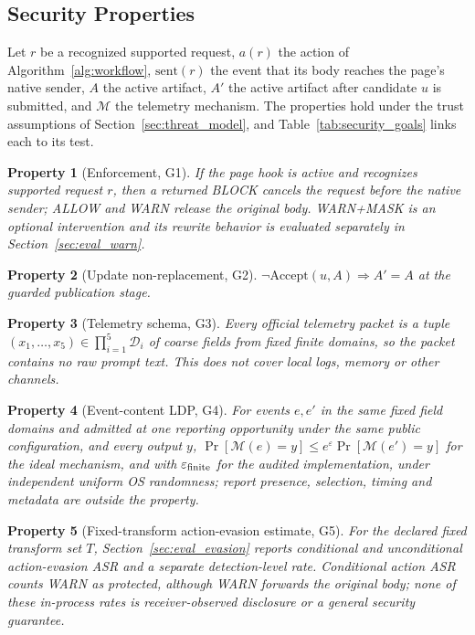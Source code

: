 \documentclass[sigconf]{acmart}
\theoremstyle{acmdefinition}\newtheorem{property}{Property}
\begin{document}
\subsection{Security Properties}
\label{sec:properties}
Let $r$ be a recognized supported request, $a(r)$ the action of Algorithm~\ref{alg:workflow}, $\mathrm{sent}(r)$ the event that its body reaches the page's native sender, $A$ the active artifact, $A'$ the active artifact after candidate $u$ is submitted, and $\mathcal M$ the telemetry mechanism. The properties hold under the trust assumptions of Section~\ref{sec:threat_model}, and Table~\ref{tab:security_goals} links each to its test.

\begin{property}[Enforcement, G1]\label{prop:g1}
If the page hook is active and recognizes supported request $r$, then a returned BLOCK cancels the request before the native sender; ALLOW and WARN release the original body. WARN+MASK is an optional intervention and its rewrite behavior is evaluated separately in Section~\ref{sec:eval_warn}.
\end{property}
\begin{property}[Update non-replacement, G2]\label{prop:g2}
$\neg\mathrm{Accept}(u,A)\Rightarrow A'=A$ at the guarded publication stage.
\end{property}
\begin{property}[Telemetry schema, G3]\label{prop:g3}
Every official telemetry packet is a tuple $(x_1,\dots,x_5)\in\prod_{i=1}^{5}\mathcal D_i$ of coarse fields from fixed finite domains, so the packet contains no raw prompt text. This does not cover local logs, memory or other channels.
\end{property}
\begin{property}[Event-content LDP, G4]\label{prop:g4}
For events $e,e'$ in the same fixed field domains and admitted at one reporting opportunity under the same public configuration, and every output $y$, $\Pr[\mathcal M(e)=y]\le e^{\varepsilon}\Pr[\mathcal M(e')=y]$ for the ideal mechanism, and with $\varepsilon_{\rm finite}$ for the audited implementation, under independent uniform OS randomness; report presence, selection, timing and metadata are outside the property.
\end{property}
\begin{property}[Fixed-transform action-evasion estimate, G5]\label{prop:g5}
For the declared fixed transform set $T$, Section~\ref{sec:eval_evasion} reports conditional and unconditional action-evasion ASR and a separate detection-level rate. Conditional action ASR counts WARN as protected, although WARN forwards the original body; none of these in-process rates is receiver-observed disclosure or a general security guarantee.
\end{property}
\end{document}

